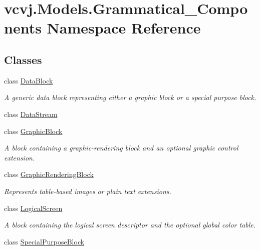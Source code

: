 \hypertarget{namespacevcvj_1_1_models_1_1_grammatical___components}{}\section{vcvj.\+Models.\+Grammatical\+\_\+\+Components Namespace Reference}
\label{namespacevcvj_1_1_models_1_1_grammatical___components}
\subsection*{Classes}
\begin{DoxyCompactItemize}
\item 
class \hyperlink{classvcvj_1_1_models_1_1_grammatical___components_1_1_data_block}{Data\+Block}
\begin{DoxyCompactList}\small\item\em A generic data block representing either a graphic block or a special purpose block. \end{DoxyCompactList}\item 
class \hyperlink{classvcvj_1_1_models_1_1_grammatical___components_1_1_data_stream}{Data\+Stream}
\item 
class \hyperlink{classvcvj_1_1_models_1_1_grammatical___components_1_1_graphic_block}{Graphic\+Block}
\begin{DoxyCompactList}\small\item\em A block containing a graphic-\/rendering block and an optional graphic control extension. \end{DoxyCompactList}\item 
class \hyperlink{classvcvj_1_1_models_1_1_grammatical___components_1_1_graphic_rendering_block}{Graphic\+Rendering\+Block}
\begin{DoxyCompactList}\small\item\em Represents table-\/based images or plain text extensions. \end{DoxyCompactList}\item 
class \hyperlink{classvcvj_1_1_models_1_1_grammatical___components_1_1_logical_screen}{Logical\+Screen}
\begin{DoxyCompactList}\small\item\em A block containing the logical screen descriptor and the optional global color table. \end{DoxyCompactList}\item 
class \hyperlink{classvcvj_1_1_models_1_1_grammatical___components_1_1_special_purpose_block}{Special\+Purpose\+Block}

\end{DoxyCompactItemize}
